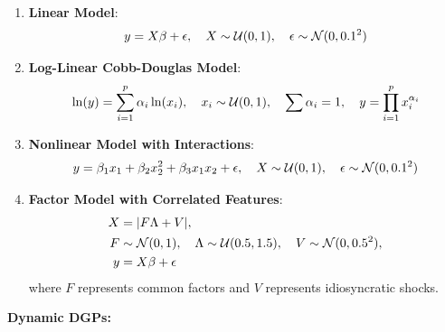 \documentclass[preprint,12pt,authoryear]{sn-jnl}
\begin{document}
\begin{enumerate} [leftmargin=*, itemsep=0pt, topsep=2pt, parsep=0pt]
    \item \textbf{Linear Model}: 
    \begin{equation} \label{eq:dgp_linear}
    \setlength{\abovedisplayskip}{5pt}
    \setlength{\belowdisplayskip}{5pt}
    y = X\beta + \epsilon, \quad X \sim \mathcal{U}(0, 1), \quad \epsilon \sim \mathcal{N}(0, 0.1^2)
    \end{equation}
    
    \item \textbf{Log-Linear Cobb-Douglas Model}: 
    \begin{equation} \label{eq:dgp_cobb_douglas}
    \setlength{\abovedisplayskip}{5pt}
    \setlength{\belowdisplayskip}{5pt}
    \ln(y) = \sum_{i=1}^p \alpha_i \ln(x_i), \quad x_i \sim \mathcal{U}(0, 1), \quad \sum \alpha_i = 1, \quad y = \prod_{i=1}^p x_i^{\alpha_i}
    \end{equation}
    
    \item \textbf{Nonlinear Model with Interactions}: 
    \begin{equation} \label{eq:dgp_interactions}
    \setlength{\abovedisplayskip}{5pt}
    \setlength{\belowdisplayskip}{5pt}
    y = \beta_1 x_1 + \beta_2 x_2^2 + \beta_3 x_1 x_2 + \epsilon, \quad X \sim \mathcal{U}(0, 1), \quad \epsilon \sim \mathcal{N}(0, 0.1^2)
    \end{equation}
    
    \item \textbf{Factor Model with Correlated Features}: 
    \begin{equation} \label{eq:dgp_factor}
    \setlength{\abovedisplayskip}{5pt}
    \setlength{\belowdisplayskip}{5pt}
    \begin{split}
    X &= |F \Lambda + V|, \\
    F &\sim \mathcal{N}(0, 1), \quad 
    \Lambda \sim \mathcal{U}(0.5, 1.5), \quad
    V \sim \mathcal{N}(0, 0.5^2), \\
    y &= X \beta + \epsilon
    \end{split}
    \end{equation}
    where $F$ represents common factors and $V$ represents idiosyncratic shocks.
\end{enumerate}

\textbf{Dynamic DGPs:}
\end{document}
